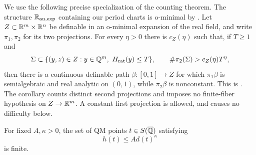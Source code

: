 We use the following precise specialization of the counting theorem.
The structure $\mathbb R_{\mathrm{an},\exp}$ containing our period charts is
o-minimal by \cite[Corollary~5.13]{DMM1994}.
Let $Z\subset\mathbb R^m\times\mathbb R^n$ be definable in an o-minimal expansion of
the real field, and write $\pi_1,\pi_2$ for its two projections.  For
every $\eta>0$ there is $c_Z(\eta)$ such that, if $T\ge1$ and
\[
 \Sigma\subset
 \{(y,z)\in Z:y\in\mathbb Q^m,\ H_{\mathrm{rat}}(y)\le T\},
 \qquad \#\pi_2(\Sigma)>c_Z(\eta)T^\eta,
\]
then there is a continuous definable path
$\beta:[0,1]\to Z$ for which $\pi_1\beta$ is semialgebraic and real
analytic on $(0,1)$, while $\pi_2\beta$ is nonconstant.  This is
\cite[Corollary~7.2, with $k=1$ and no family parameter]{HabeggerPila2016}.
The corollary counts distinct second projections and imposes no
finite-fiber hypothesis on $Z\to\mathbb R^m$.  A constant first projection is
allowed, and causes no difficulty below.

\begin{proposition}\label{prop:counting-finiteness}
For fixed $A,\kappa>0$, the set of QM points $t\in S(\overline{\mathbb Q})$ satisfying
\begin{equation}\label{eq:counting-height-hypothesis}
 h(t)\le A d(t)^\kappa
\end{equation}
is finite.
\end{proposition}

